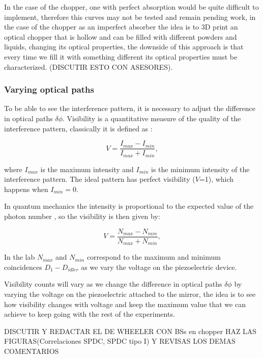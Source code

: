 \documentclass[12pt]{article}
\begin{document}
In the case of the chopper, one with perfect absorption would be quite difficult to implement, therefore this curves may not be tested and remain pending work, in the case of the chopper as an imperfect absorber the idea is to 3D print an optical chopper that is hollow and can be filled with different powders and liquids, changing its optical properties, the downside of this approach is that every time we fill it with something different its optical properties must be characterized. (DISCUTIR ESTO CON ASESORES).



\subsubsection{Varying optical paths}

To be able to see the interference pattern, it is necessary to adjust the difference in optical paths $\delta \phi$. Visibility is a quantitative measure of the quality of the interference pattern, classically it is defined as \cite{hecht}:

\begin{equation}
V=\frac{I_{max}-I_{min}}{I_{max}+I_{min}},
\end{equation}

where $I_{max}$ is the maximum intensity and $I_{min}$ is the minimum intensity of the interference pattern. The ideal pattern has perfect visibility ($V$=1), which happens when $I_{min}=0$.

In quantum mechanics the intensity is proportional to the expected value of the photon number \cite {glauber}, so the visibility is then given by:

\begin{equation}
V=\frac{N_{max}-N_{min}}{N_{max}+N_{min}},
\end{equation}

In the lab $N_{max}$ and $N_{min}$ correspond to the maximum and minimum coincidences $D_{1}-D_{idler}$ as we vary the voltage on the piezoelectric device.

Visibility counts will vary as we change the difference in optical paths $\delta\phi$ by varying the voltage on the piezoelectric attached to the mirror, the idea is to see how visibility changes with voltage and keep the maximum value that we can achieve to keep going with the rest of the experiments.


DISCUTIR Y REDACTAR EL DE WHEELER CON BSs en chopper
 HAZ LAS FIGURAS(Correlaciones SPDC, SPDC tipo I) Y REVISAS LOS DEMAS COMENTARIOS
 
\end{document}
